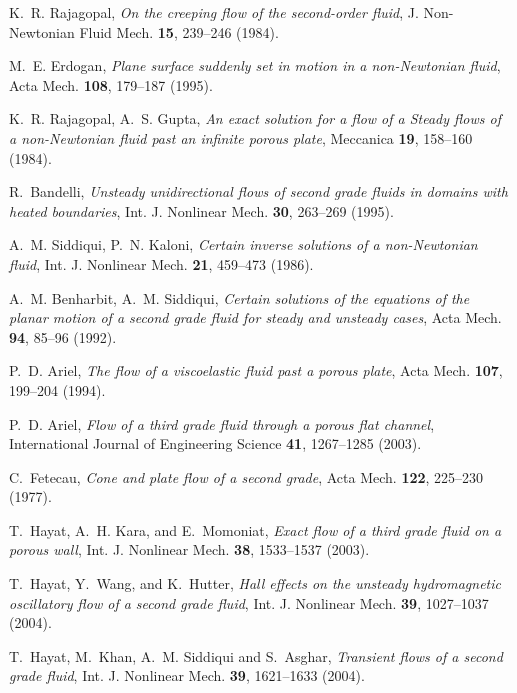 \documentclass[twocolumn,showpacs,preprintnumbers,amsmath,amssymb]{revtex4}
\begin{document}
\begin{thebibliography}{10}
K.~R. Rajagopal, \emph{On the creeping flow of the second-order
fluid}, J. Non-Newtonian Fluid Mech. \textbf{15}, 239--246 (1984).

M.~E. Erdogan, \emph{Plane surface suddenly set in motion in a
non-Newtonian fluid}, Acta Mech. \textbf{108}, 179--187 (1995).

K.~R. Rajagopal, A.~S. Gupta, \emph{An exact solution for a flow of
a Steady flows of a non-Newtonian fluid past an infinite porous
plate}, Meccanica \textbf{19}, 158--160 (1984).

R.~Bandelli, \emph{Unsteady unidirectional flows of second grade
fluids in domains with heated boundaries}, Int. J. Nonlinear Mech.
\textbf{30}, 263--269 (1995).

A.~M. Siddiqui, P.~N. Kaloni, \emph{Certain inverse solutions of a
non-Newtonian fluid}, Int. J. Nonlinear Mech. \textbf{21}, 459--473
(1986).

A.~M. Benharbit, A.~M. Siddiqui, \emph{Certain solutions of the
equations of the planar motion of a second grade fluid for steady
and unsteady cases}, Acta Mech. \textbf{94}, 85--96 (1992).

P.~D. Ariel, \emph{The flow of a viscoelastic fluid past a porous
plate}, Acta Mech. \textbf{107}, 199--204 (1994).

P.~D. Ariel, \emph{Flow of a third grade fluid through a porous flat
channel}, International Journal of Engineering Science \textbf{41},
1267--1285 (2003).

C.~Fetecau, \emph{Cone and plate flow of a second grade}, Acta Mech.
\textbf{122}, 225--230 (1977).

T.~Hayat, A.~H. Kara, and E.~Momoniat, \emph{Exact flow of a third
grade fluid on a porous wall}, Int. J. Nonlinear Mech. \textbf{38},
1533--1537 (2003).

T.~Hayat, Y.~Wang, and K.~Hutter, \emph{Hall effects on the unsteady
hydromagnetic oscillatory flow of a second grade fluid}, Int. J.
Nonlinear Mech. \textbf{39}, 1027--1037 (2004).

T.~Hayat, M.~Khan, A.~M. Siddiqui and S.~Asghar, \emph{Transient
flows of a second grade fluid}, Int. J. Nonlinear Mech. \textbf{39},
1621--1633 (2004).


\end{thebibliography}
\end{document}
